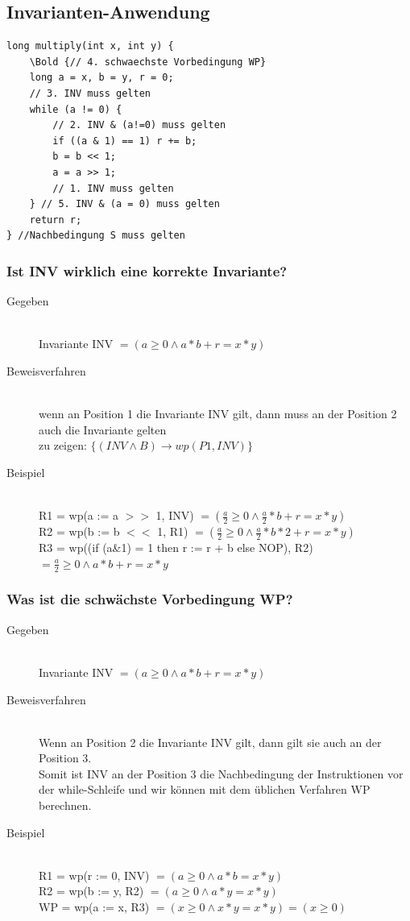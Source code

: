 \documentclass[a4paper,10pt]{article}
\newcommand{\Bold}[1]{\textbf{#1}} %
\newcommand{\ra}{\rightarrow}
\begin{document}
\subsection{Invarianten-Anwendung}
\begin{lstlisting}
long multiply(int x, int y) {
	\Bold {// 4. schwaechste Vorbedingung WP}
	long a = x, b = y, r = 0;
	// 3. INV muss gelten
	while (a != 0) {
		// 2. INV & (a!=0) muss gelten
		if ((a & 1) == 1) r += b;
		b = b << 1;
		a = a >> 1;
		// 1. INV muss gelten
	} // 5. INV & (a = 0) muss gelten
	return r;
} //Nachbedingung S muss gelten
\end{lstlisting}
\subsubsection{Ist INV wirklich eine korrekte Invariante?}
\begin{description}
	\item[Gegeben] \hfill \\
		Invariante INV $= (a \geq 0 \wedge a*b + r = x*y)$ 
	\item[Beweisverfahren] \hfill \\
		wenn an Position 1 die Invariante INV gilt, dann muss an der Position 2 auch die Invariante gelten \\
		zu zeigen: $\{ (INV \wedge B) \ra wp(P1, INV) \}$
	\item[Beispiel] \hfill \\
		R1 = wp(a := a $>>$ 1, INV) $= (\frac{a}{2} \geq 0 \wedge \frac{a}{2}*b + r = x*y)$ \\
		R2 = wp(b := b $<<$ 1, R1) $= (\frac{a}{2} \geq 0 \wedge \frac{a}{2}*b*2 + r = x*y)$ \\
		R3 = wp((if (a\&1) = 1 then r := r + b else NOP), R2) $= \frac{a}{2} \geq 0 \wedge a*b + r = x*y$
\end{description}

\subsubsection{Was ist die schw\"achste Vorbedingung WP?}
\begin{description}
	\item[Gegeben] \hfill \\
		Invariante INV $= (a \geq 0 \wedge a*b + r = x*y)$ 
	\item[Beweisverfahren] \hfill \\
		Wenn an Position 2 die Invariante INV gilt, dann gilt sie auch an der Position 3. \\
		Somit ist INV an der Position 3 die Nachbedingung der Instruktionen vor der while-Schleife und wir k\"onnen mit dem üblichen Verfahren WP berechnen.
	\item[Beispiel] \hfill \\
		R1 = wp(r := 0, INV) $= (a \geq 0 \wedge a*b = x*y)$ \\
		R2 = wp(b := y, R2) $= (a \geq 0 \wedge a*y = x*y)$ \\
		WP = wp(a := x, R3) $= (x \geq 0 \wedge x*y = x*y) = (x \geq 0)$
\end{description}
\end{document}
